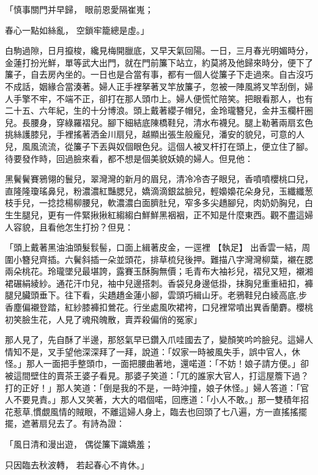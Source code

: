 \begin{showcontents}{}
「慎事關門并早歸，  眼前恩愛隔崔嵬；

春心一點如絲亂，  空鎖牢籠總是虛。」

白駒過隙，日月攛梭，纔見梅開臘底，又早天氣回陽。一日，三月春光明媚時分，金蓮打扮光鮮，單等武大出門，就在門前簾下站立，約莫將及他歸來時分，便下了簾子，自去房內坐的。一日也是合當有事，都有一個人從簾子下走過來。自古沒巧不成話，姻緣合當湊著。婦人正手裡拏著叉竿放簾子，忽被一陣風將叉竿刮倒，婦人手擎不牢，不端不正，卻打在那人頭巾上。婦人便慌忙陪笑。把眼看那人，也有二十五、六年紀，生的十分博浪。頭上戴著纓子帽兒，金玲瓏簪兒，金井玉欄杆圈兒。長腰身，穿綠羅褶兒。腳下細結底陳橋鞋兒，清水布襪兒。腿上勒著兩扇玄色挑絲護膝兒，手裡搖著洒金川扇兒，越顯出張生般龐兒，潘安的貌兒，可意的人兒，風風流流，從簾子下丟與奴個眼色兒。這個人被叉杆打在頭上，便立住了腳。待要發作時，回過臉來看，都不想是個美貌妖嬈的婦人。但見他：

黑鬢鬢賽鴉翎的鬟兒，翠灣灣的新月的眉兒，清冷冷杏子眼兒，香噴噴櫻桃口兒，直隆隆瓊瑤鼻兒，粉濃濃紅豔腮兒，嬌滴滴銀盆臉兒，輕嬝嬝花朵身兒，玉纖纖葱枝手兒，一捻捻楊柳腰兒，軟濃濃白面臍肚兒，窄多多尖趫腳兒，肉奶奶胸兒，白生生腿兒，更有一件緊揪揪紅縐縐白鮮鮮黑裀裀，正不知是什麼東西。觀不盡這婦人容貌，且看他怎生打扮？但見：

「頭上戴著黑油油頭髮䯼髻，口面上緝著皮金，一逕裡
【執足】
出香雲一結，周圍小簪兒齊插。六鬢斜插一朵並頭花，排草梳兒後押。難描八字灣灣柳葉，襯在腮兩朵桃花。玲瓏墜兒最堪誇，露賽玉酥胸無價；毛青布大袖衫兒，褶兒又短，襯湘裙碾絹綾紗。通花汗巾兒，袖中兒邊搭刺。香袋兒身邊低掛，抹胸兒重重紐扣，褲腿兒臟頭垂下。往下看，尖趫趫金蓮小腳，雲頭巧緝山牙。老鴉鞋兒白綾高底,步香塵偏襯登踏，紅紗膝褲扣鶯花。行坐處風吹裙袴，口兒裡常噴出異香蘭麝。櫻桃初笑臉生花，人見了魂飛魄散，賣弄殺偏俏的冤家」

那人見了，先自酥了半邊，那怒氣早已鑽入爪哇國去了，變顏笑吟吟臉兒。這婦人情知不是，叉手望他深深拜了一拜，說道：「奴家一時被風失手，誤中官人，休怪。」那人一面把手整頭巾，一面把腰曲著地，還喏道：「不妨！娘子請方便。」卻被這間壁住的賣茶王婆子看見。那婆子笑道：「兀的誰家大官人，打這屋簷下過？打的正好！」那人笑道：「倒是我的不是，一時沖撞，娘子休怪。」婦人答道：「官人不要見責。」那人又笑著，大大的唱個喏，回應道：「小人不敢。」那一雙積年招花惹草,慣覷風情的賊眼，不離這婦人身上，臨去也回頭了七八遍，方一直搖搖擺擺，遮著扇兒去了。有詩為證：

「風日清和漫出遊，  偶從簾下識嬌羞；

只因臨去秋波轉，  若起春心不肯休。」


\end{showcontents}
